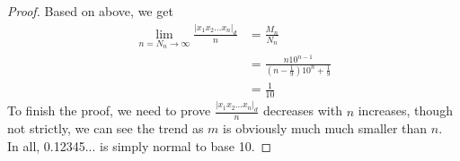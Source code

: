 \documentclass{article}
\begin{document}
\begin{proof}
    Based on above, we get 
    \begin{align*}
        \lim_{n = N_n \rightarrow \infty } \frac{|x_1x_2...x_n|_d}{n} & = \frac{M_n}{N_n}\\
            &= \frac{n10^{n - 1}}{(n - \frac{1}{9})10^n + \frac{1}{9}}\\
            &= \frac{1}{10}
    \end{align*}
    \hspace*{1em} To finish the proof, we need to prove $\frac{|x_1x_2...x_n|_d}{n}$ decreases with $n$ increases,
    though not strictly, we can see the trend as $m$ is obviously much much smaller than $n$.\\
    \hspace*{1em} In all, 0.12345... is simply normal to base 10.

\end{proof}
\end{document}
